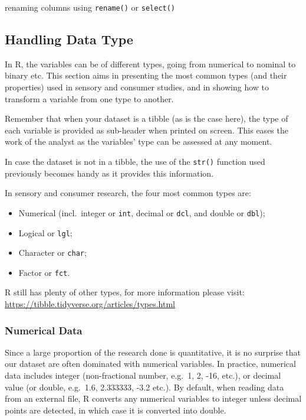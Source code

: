 \documentclass[
]{book}
\providecommand{\tightlist}{%
  \setlength{\itemsep}{0pt}\setlength{\parskip}{0pt}}
\begin{document}
renaming columns using \texttt{rename()} or \texttt{select()}

\hypertarget{handling-data-type}{%
\subsection{Handling Data Type}\label{handling-data-type}}

In R, the variables can be of different types, going from numerical to nominal to binary etc. This section aims in presenting the most common types (and their properties) used in sensory and consumer studies, and in showing how to transform a variable from one type to another.

Remember that when your dataset is a tibble (as is the case here), the type of each variable is provided as sub-header when printed on screen. This eases the work of the analyst as the variables' type can be assessed at any moment.

In case the dataset is not in a tibble, the use of the \texttt{str()} function used previously becomes handy as it provides this information.

In sensory and consumer research, the four most common types are:

\begin{itemize}
\tightlist
\item
  Numerical (incl.~integer or \texttt{int}, decimal or \texttt{dcl}, and double or \texttt{dbl});
\item
  Logical or \texttt{lgl};
\item
  Character or \texttt{char};
\item
  Factor or \texttt{fct}.
\end{itemize}

R still has plenty of other types, for more information please visit: \url{https://tibble.tidyverse.org/articles/types.html}

\hypertarget{numerical-data}{%
\subsubsection{Numerical Data}\label{numerical-data}}

Since a large proportion of the research done is quantitative, it is no surprise that our dataset are often dominated with numerical variables. In practice, numerical data includes integer (non-fractional number, e.g.~1, 2, -16, etc.), or decimal value (or double, e.g.~1.6, 2.333333, -3.2 etc.).
By default, when reading data from an external file, R converts any numerical variables to integer unless decimal points are detected, in which case it is converted into double.
\end{document}
